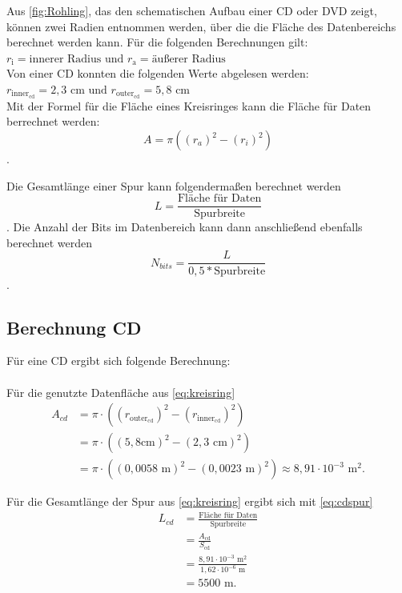 \documentclass[9pt,twocolumn,twoside]{pnas-new}
\begin{document}
Aus \ref{fig:Rohling}, das den schematischen Aufbau einer CD oder DVD zeigt, können zwei Radien entnommen werden, über die die Fläche des Datenbereichs berechnet werden kann.
Für die folgenden Berechnungen gilt:  \begin{math} r_{\mbox{i}}  = \mbox{innerer Radius und } r_{\mbox{a}} = \mbox{äußerer Radius} \end{math} \\
Von einer CD konnten die folgenden Werte abgelesen werden: \begin{math} r_{\mbox{inner}_{\mbox{cd}}} = 2,3 \mbox{ cm und } r_{\mbox{outer}_{\mbox{cd}}} = 5,8 \mbox{ cm} \end{math} \\

Mit der Formel für die Fläche eines Kreisringes \cite[Seite 147]{Bartsch2014} kann die Fläche für Daten berrechnet werden: \begin{equation} \label{eq:kreisring} A = \pi((r_a)^2-(r_i)^2)  \end{equation}. 

Die Gesamtlänge einer Spur kann folgendermaßen berechnet werden \begin{equation} \label{eq:gesamtlänge} L = \frac{\mbox{Fläche für Daten}}{\mbox{Spurbreite}} \end{equation}.
Die Anzahl der Bits im Datenbereich kann dann anschließend ebenfalls berechnet werden \begin{equation} \label{eq:bitanzahl} N_{bits} = \frac{L}{0,5*\mbox{Spurbreite}} \end{equation}.

\subsection{Berechnung CD}
Für eine CD ergibt sich folgende Berechnung: \\ \\
Für die genutzte Datenfläche aus \eqref{eq:kreisring}
\begin{align*}
 A_{cd} &= \pi\cdot((r_{\mbox{outer}_{\mbox{cd}}})^2-(r_{\mbox{inner}_{\mbox{cd}}})^2)\\	
&= \pi\cdot((5,8\mbox{cm})^2-(2,3\mbox{ cm})^2) \\
 &=  \pi\cdot((0,0058\mbox{ m})^2-(0,0023\mbox{ m})^2) \approx  8,91\cdot10^{-3}\mbox{ m}^2.
\end{align*}

Für die Gesamtlänge der Spur aus \eqref{eq:kreisring} ergibt sich mit \eqref{eq:cdspur}
\begin{align*}
 L_{cd} &= \frac{\mbox{Fläche für Daten}}{\mbox{Spurbreite}}\\
 &= \frac{A_{\mbox{cd}}}{S_{\mbox{cd}}}\\
 &= \frac{8,91\cdot10^{-3}\mbox{ m}^2}{1,62\cdot10^{-6}\mbox{ m} }\\
 &= 5500\mbox{ m}.
\end{align*}
\end{document}
